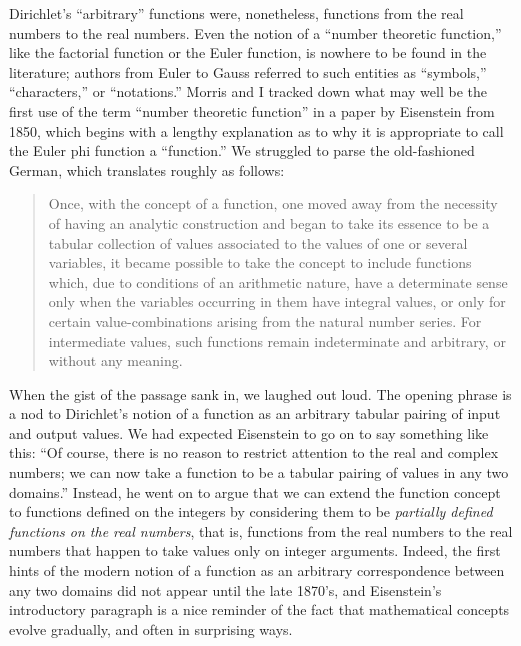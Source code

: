 \documentclass[11pt]{article}
\begin{document}
Dirichlet's ``arbitrary'' functions were, nonetheless, functions from the real numbers to the real numbers. Even the notion of a ``number theoretic function,'' like the factorial function or the Euler function, is nowhere to be found in the literature; authors from Euler to Gauss referred to such entities as ``symbols,'' ``characters,'' or ``notations.'' Morris and I tracked down what may well be the first use of the term ``number theoretic function'' in a paper by Eisenstein from 1850, which begins with a lengthy explanation as to why it is appropriate to call the Euler phi function a ``function.'' We struggled to parse the old-fashioned German, which translates roughly as follows:
\begin{quote}
Once, with the concept of a function, one moved away from the necessity of having an analytic construction and began to take its essence to be a tabular collection of values associated to the values of one or several variables, it became possible to take the concept to include functions which, due to conditions of an arithmetic nature, have a determinate sense only when the variables occurring in them have integral values, or only for certain value-combinations arising from the natural number series. For intermediate values, such functions remain indeterminate and arbitrary, or without any meaning. 
\end{quote}
When the gist of the passage sank in, we laughed out loud. The opening phrase is a nod to Dirichlet's notion of a function as an arbitrary tabular pairing of input and output values. We had expected Eisenstein to go on to say something like this: ``Of course, there is no reason to restrict attention to the real and complex numbers; we can now take a function to be a tabular pairing of values in any two domains.'' Instead, he went on to argue that we can extend the function concept to functions defined on the integers by considering them to be \emph{partially defined functions on the real numbers}, that is, functions from the real numbers to the real numbers that happen to take values only on integer arguments. Indeed, the first hints of the modern notion of a function as an arbitrary correspondence between any two domains did not appear until the late 1870's, and Eisenstein's introductory paragraph is a nice reminder of the fact that mathematical concepts evolve gradually, and often in surprising ways.
\end{document}
